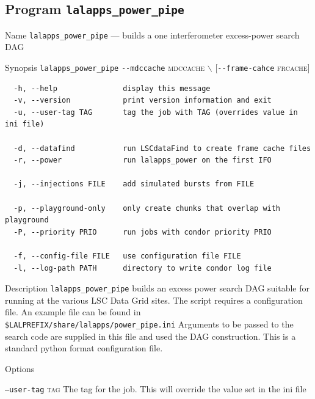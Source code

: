 \clearpage
\subsection{Program \texttt{lalapps\_power\_pipe}}
\label{program:lalapps-power-pipe}

\begin{entry}

\item[Name]
\verb$lalapps_power_pipe$ --- builds a one interferometer
excess-power search DAG   

\item[Synopsis]
\verb$lalapps_power_pipe$ 
\verb$--mdccache$ \textsc{mdccache}
$\backslash$ \newline \hspace*{0.25in}
[\verb$--frame-cahce$ \textsc{frcache}]
\begin{verbatim}
  -h, --help               display this message
  -v, --version            print version information and exit
  -u, --user-tag TAG       tag the job with TAG (overrides value in ini file)

  -d, --datafind           run LSCdataFind to create frame cache files
  -r, --power              run lalapps_power on the first IFO

  -j, --injections FILE    add simulated bursts from FILE

  -p, --playground-only    only create chunks that overlap with playground
  -P, --priority PRIO      run jobs with condor priority PRIO

  -f, --config-file FILE   use configuration file FILE
  -l, --log-path PATH      directory to write condor log file
\end{verbatim}

\item[Description] 
\verb$lalapps_power_pipe$ builds an excess power search DAG suitable
for running at the various LSC Data Grid sites.   The script requires
a configuration file.   An example file can be found in
\verb+$LALPREFIX/share/lalapps/power_pipe.ini+    Arguments to be
passed to the search code are supplied in this file and used the DAG
construction.    This is a standard python format configuration file.

\item[Options]\leavevmode
\begin{entry}
\item[\texttt{--user-tag}  \textsc{tag}]   The tag for the job.  This
will override the value set in the ini file


\end{entry}
\end{entry}
